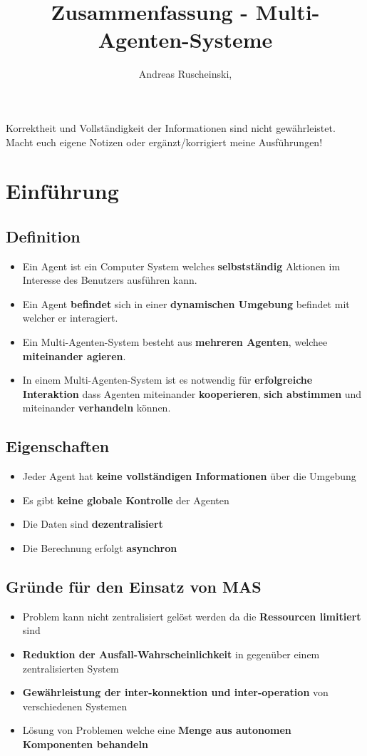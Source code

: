 \documentclass{article} %
\title{Zusammenfassung - Multi-Agenten-Systeme}
\author{
	Andreas Ruscheinski,
}
\begin{document}
\maketitle
\begin{framed}Korrektheit und Vollständigkeit der Informationen sind nicht gewährleistet.
Macht euch eigene Notizen oder ergänzt/korrigiert meine Ausführungen!
\end{framed}
\setcounter{tocdepth}{1}
\tableofcontents

\section{Einführung}
	\subsection{Definition}
	\begin{itemize}
		\item Ein Agent ist ein Computer System welches \textbf{selbstständig} Aktionen im Interesse des Benutzers ausführen kann.
		\item Ein Agent \textbf{befindet} sich in einer \textbf{dynamischen Umgebung} befindet mit welcher er interagiert.
		\item Ein Multi-Agenten-System besteht aus \textbf{mehreren Agenten}, welchee \textbf{miteinander agieren}.
		\item In einem Multi-Agenten-System ist es notwendig für \textbf{erfolgreiche Interaktion} dass Agenten miteinander \textbf{kooperieren},\textbf{ sich abstimmen} und miteinander \textbf{verhandeln} können.
	\end{itemize}
	\subsection{Eigenschaften}
	\begin{itemize}
		\item Jeder Agent hat \textbf{keine vollständigen Informationen} über die Umgebung
		\item Es gibt \textbf{keine globale Kontrolle} der Agenten
		\item Die Daten sind \textbf{dezentralisiert}
		\item Die Berechnung erfolgt \textbf{asynchron}
	\end{itemize}
	\subsection{Gründe für den Einsatz von MAS}
	\begin{itemize}
		\item Problem kann nicht zentralisiert gelöst werden da die \textbf{Ressourcen limitiert} sind
		\item \textbf{Reduktion der Ausfall-Wahrscheinlichkeit} in gegenüber einem zentralisierten System
		\item \textbf{Gewährleistung der inter-konnektion und inter-operation} von verschiedenen Systemen
		\item Lösung von Problemen welche eine\textbf{ Menge aus autonomen Komponenten behandeln}
	\end{itemize}
\end{document}
